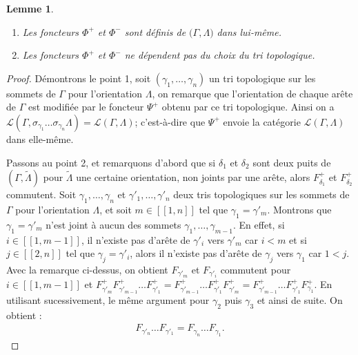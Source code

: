 \documentclass[a4paper,11pt]{article}
\newtheorem{lm}[thm]{Lemme}%
\begin{document}
\begin{lm}
\label{lem2}
~
  \begin{enumerate}
  \item Les foncteurs $\Phi^{+}$ et $\Phi^{-}$ sont définis de $\mathscr(\Gamma, \Lambda)$ dans lui-même.
  \item Les foncteurs $\Phi^{+}$ et $\Phi^{-}$ ne dépendent pas du choix du tri topologique.
  \end{enumerate}
\end{lm}
\begin{proof}
  Démontrons le point 1, soit $(\gamma_{1}, \dots, \gamma_{n})$ un tri topologique sur les sommets de $\Gamma$ pour l'orientation $\Lambda$, on remarque que l'orientation de chaque arête de $\Gamma$ est modifiée par le foncteur $\Psi^{+}$ obtenu par ce tri topologique. Ainsi on a $\mathscr L(\Gamma,\sigma_{\gamma_{1}} \dots \sigma_{\gamma_{n}}\Lambda) = \mathscr L(\Gamma,\Lambda)$; c'est-à-dire que $\Psi^{+}$ envoie la catégorie $\mathscr L(\Gamma,\Lambda)$ dans elle-même.

  Passons au point 2, et remarquons d'abord que si $\delta_{1}$ et $\delta_{2}$ sont deux puits de $(\Gamma,\widetilde \Lambda)$ pour $\widetilde \Lambda$ une certaine orientation, non joints par une arête, alors $F^{+}_{\delta_{1}}$ et $F^{+}_{\delta_{2}}$ commutent. 
Soit $\gamma_{1}, \dots, \gamma_{n}$ et $\gamma'_{1}, \dots , \gamma'_{n}$ deux tris topologiques sur les sommets de $\Gamma$ pour l'orientation $\Lambda$, et soit $m \in [\![1,n]\!]$ tel que $\gamma_{1}= \gamma'_{m}$. Montrons que $\gamma_{1} = \gamma'_{m}$ n'est joint à aucun des sommets $\gamma_{1},\dots, \gamma_{m-1}$. En effet, si $i \in [\![1,m-1]\!]$, il n'existe pas d'arête de $\gamma'_{i}$ vers $\gamma'_{m}$ car $i<m$ et si $j \in [\![2,n]\!]$ tel que $\gamma_{j} = \gamma'_{i}$, alors il n'existe pas d'arête de $\gamma_{j}$ vers $\gamma_{1}$ car $1<j$. Avec la remarque ci-dessus, on obtient $F_{\gamma'_{m}}$ et $F_{\gamma'_{i}}$ commutent pour $i \in [\![1,m-1]\!]$ et $F^{+}_{\gamma'_{m}}F^{+}_{\gamma'_{m-1}}\dots F^{+}_{\gamma'_{1}} = F^{+}_{\gamma'_{m-1}}\dots F^{+}_{\gamma'_{1}} F^{+}_{\gamma'_{m}} = F^{+}_{\gamma'_{m-1}}\dots F^{+}_{\gamma'_{1}}F^{+}_{\gamma_{1}}$. En utilisant sucessivement, le même argument pour $\gamma_{2}$ puis $\gamma_{3}$ et ainsi de suite. On obtient : 
\begin{eqnarray*}%
  F_{\gamma'_{n}}\dots F_{\gamma'_{1}} = F_{\gamma_{n}} \dots F_{\gamma_{1}}.
\end{eqnarray*}
\end{proof}
\end{document}
